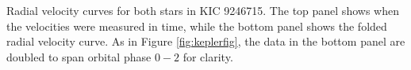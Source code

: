 \label{fig:rvfig} Radial velocity curves for both stars in KIC 9246715. The top panel shows when the velocities were measured in time, while the bottom panel shows the folded radial velocity curve. As in Figure \ref{fig:keplerfig}, the data in the bottom panel are doubled to span orbital phase $0-2$ for clarity.